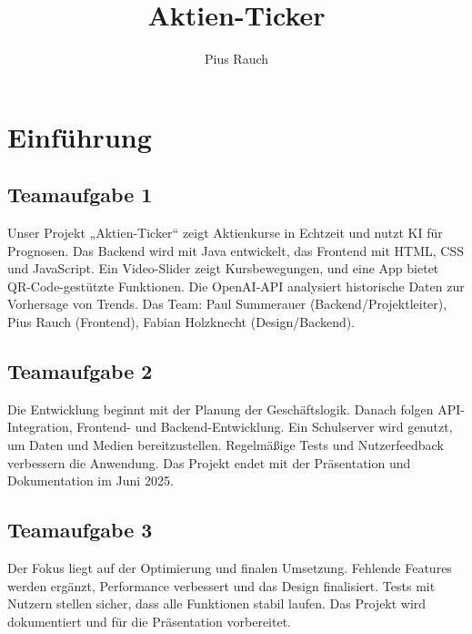 \documentclass{report}
\title{Aktien-Ticker}
\author{Pius Rauch}
\begin{document}
\maketitle

\chapter{Einführung}

\section{Teamaufgabe 1}

Unser Projekt „Aktien-Ticker“ zeigt Aktienkurse in Echtzeit und nutzt KI für Prognosen.  
Das Backend wird mit Java entwickelt, das Frontend mit HTML, CSS und JavaScript.  
Ein Video-Slider zeigt Kursbewegungen, und eine App bietet QR-Code-gestützte Funktionen.  
Die OpenAI-API analysiert historische Daten zur Vorhersage von Trends.  
Das Team: Paul Summerauer (Backend/Projektleiter), Pius Rauch (Frontend), Fabian Holzknecht (Design/Backend).  

\section{Teamaufgabe 2}

Die Entwicklung beginnt mit der Planung der Geschäftslogik.  
Danach folgen API-Integration, Frontend- und Backend-Entwicklung.  
Ein Schulserver wird genutzt, um Daten und Medien bereitzustellen.  
Regelmäßige Tests und Nutzerfeedback verbessern die Anwendung.  
Das Projekt endet mit der Präsentation und Dokumentation im Juni 2025.  

\section{Teamaufgabe 3}

Der Fokus liegt auf der Optimierung und finalen Umsetzung.  
Fehlende Features werden ergänzt, Performance verbessert und das Design finalisiert.  
Tests mit Nutzern stellen sicher, dass alle Funktionen stabil laufen.  
Das Projekt wird dokumentiert und für die Präsentation vorbereitet.  
\end{document}
